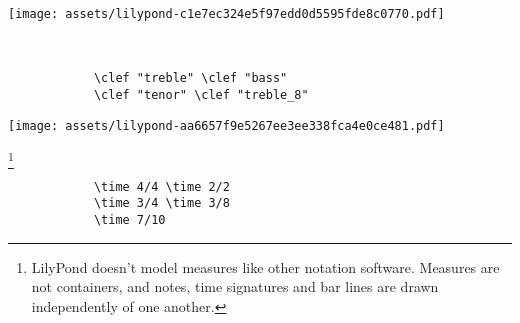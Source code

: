 \documentclass[a4paper]{tufte-handout}
\newenvironment{abjadbookoutput}{}{}
\begin{document}
\begin{description}
\begin{multicols}{2}
            \begin{abjadbookoutput}
            \noindent\texttt{[image: assets/lilypond-c1e7ec324e5f97edd0d5595fde8c0770.pdf]}
            \end{abjadbookoutput}

        \end{multicols}

    \item[Clefs:]
        \hfill \vspace{-\baselineskip} \\
        \begin{multicols}{2}

            \begin{verbatim}
            \clef "treble" \clef "bass"
            \clef "tenor" \clef "treble_8"
            \end{verbatim}

            \begin{comment}
            <lilypond>[stylesheet=stylesheet-minimal.ily]
            {
                \clef "treble" c'4
                \clef "bass" c'4
                \clef "tenor" c'4
                \clef "treble_8" c'4
            }
            </lilypond>
            \end{comment}

            \begin{abjadbookoutput}
            \noindent\texttt{[image: assets/lilypond-aa6657f9e5267ee3ee338fca4e0ce481.pdf]}
            \end{abjadbookoutput}

        \end{multicols}

    \item[Time signatures:]\footnote{%
        LilyPond doesn't model measures like other notation software. Measures
        are not containers, and notes, time signatures and bar lines are drawn
        independently of one another.}
        \hfill \vspace{-\baselineskip} \\
        \begin{multicols}{2}

            \begin{verbatim}
            \time 4/4 \time 2/2
            \time 3/4 \time 3/8
            \time 7/10
            \end{verbatim}

            \begin{comment}
            <lilypond>
            \new Staff \with {
                \override BarLine.stencil = ##f
            } {
                \time 4/4 s4
                \time 2/2 s4
                \time 3/4 s4
                \time 3/8 s4
                \time 7/10 s4
            }
            </lilypond>
            \end{comment}


\end{multicols}
\end{description}
\end{document}
